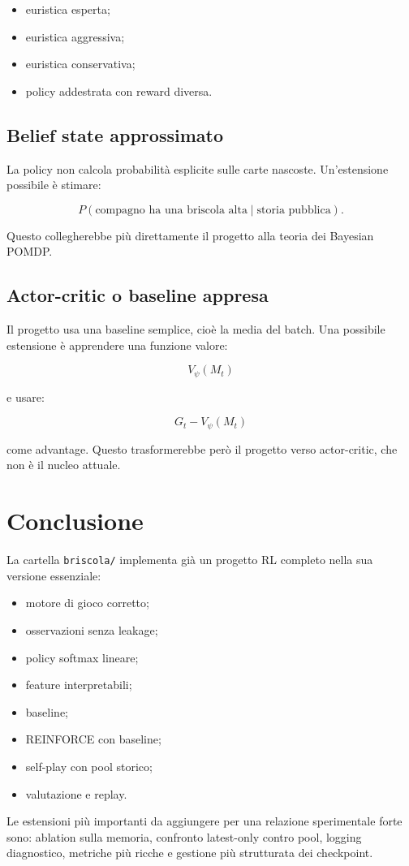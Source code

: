 \documentclass[11pt,a4paper]{article}
\begin{document}
\begin{itemize}
  \item euristica esperta;
  \item euristica aggressiva;
  \item euristica conservativa;
  \item policy addestrata con reward diversa.
\end{itemize}

\subsection{Belief state approssimato}

La policy non calcola probabilità esplicite sulle carte nascoste. Un'estensione
possibile è stimare:

\[
P(\text{compagno ha una briscola alta} \mid \text{storia pubblica}).
\]

Questo collegherebbe più direttamente il progetto alla teoria dei Bayesian
POMDP.

\subsection{Actor-critic o baseline appresa}

Il progetto usa una baseline semplice, cioè la media del batch. Una possibile
estensione è apprendere una funzione valore:

\[
V_\psi(M_t)
\]

e usare:

\[
G_t - V_\psi(M_t)
\]

come advantage. Questo trasformerebbe però il progetto verso actor-critic, che
non è il nucleo attuale.

\section{Conclusione}

La cartella \texttt{briscola/} implementa già un progetto RL completo nella sua
versione essenziale:

\begin{itemize}
  \item motore di gioco corretto;
  \item osservazioni senza leakage;
  \item policy softmax lineare;
  \item feature interpretabili;
  \item baseline;
  \item REINFORCE con baseline;
  \item self-play con pool storico;
  \item valutazione e replay.
\end{itemize}

Le estensioni più importanti da aggiungere per una relazione sperimentale forte
sono: ablation sulla memoria, confronto latest-only contro pool, logging
diagnostico, metriche più ricche e gestione più strutturata dei checkpoint.
\end{document}
